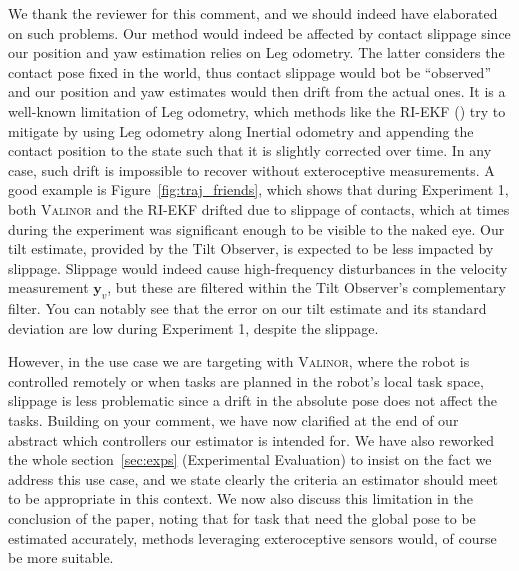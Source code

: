 We thank the reviewer for this comment, and we should indeed have elaborated on such problems. Our method would indeed be affected by contact slippage since our position and yaw estimation relies on Leg odometry. The latter considers the contact pose fixed in the world, thus contact slippage would bot be ``observed'' and our position and yaw estimates would then drift from the actual ones. It is a well-known limitation of Leg odometry, which methods like the RI-EKF (\cite{Hartley2020RIEKF}) try to mitigate by using Leg odometry along Inertial odometry and appending the contact position to the state such that it is slightly corrected over time. In any case, such drift is impossible to recover without exteroceptive measurements. A good example is Figure~\ref{fig:traj_friends}, which shows that during Experiment 1, both {\scshape Valinor} and the RI-EKF drifted due to slippage of contacts, which at times during the experiment was significant enough to be visible to the naked eye.
Our tilt estimate, provided by the Tilt Observer, is expected to be less impacted by slippage. Slippage would indeed cause high-frequency disturbances in the velocity measurement $\boldsymbol{y}_v$, but these are filtered within the Tilt Observer's complementary filter. You can notably see that the error on our tilt estimate and its standard deviation are low during Experiment 1, despite the slippage.

However, in the use case we are targeting with {\scshape Valinor}, where the robot is controlled remotely or when tasks are planned in the robot's local task space, slippage is less problematic since a drift in the absolute pose does not affect the tasks. Building on your comment, we have now clarified at the end of our abstract which controllers our estimator is intended for. We have also reworked the whole section~\ref{sec:exps} (Experimental Evaluation) to insist on the fact we address this use case, and we state clearly the criteria an estimator should meet to be appropriate in this context. We now also discuss this limitation in the conclusion of the paper, noting that for task that need the global pose to be estimated accurately, methods leveraging exteroceptive sensors would, of course be more suitable. 

